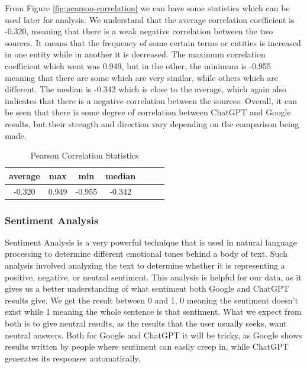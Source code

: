 \documentclass[50pt]{usiinfbachelorproject}
\begin{document}
  From Figure \ref{fig:pearson-correlation} we can have some statistics which can be used later for analysis. We understand that the average correlation coefficient is -0.320, meaning that there is a weak negative correlation between the two sources. It means that the frequency of some certain terms or entities is increased in one entity while in another it is decreased. The maximum correlation coefficient which went was 0.949, but in the other, the minimum is -0.955 meaning that there are some which are very similar, while others which are different. The median is -0.342 which is close to the average, which again also indicates that there is a negative correlation between the sources. Overall, it can be seen that there is some degree of correlation between ChatGPT and Google results, but their strength and direction vary depending on the comparison being made.

\begin{table}[H]
    \centering
    \begin{tabular}{|c|c|c|c|c|c|c|}
      \hline
      average & max & min & median \\
      \hline
      \hline
      -0.320 & 0.949 & -0.955 & -0.342 \\
      \hline
    \end{tabular}
    \caption{Pearson Correlation Statistics}
    \label{tab:cosine_similarity_statistics}
\end{table}

\subsubsection{Sentiment Analysis}
Sentiment Analysis \cite{medhat2014sentiment} is a very powerful technique that is used in natural language processing to determine different emotional tones behind a body of text. Such analysis involved analyzing the text to determine whether it is representing a positive, negative, or neutral sentiment. This analysis is helpful for our data, as it gives us a better understanding of what sentiment both Google and ChatGPT results give. We get the result between 0 and 1, 0 meaning the sentiment doesn’t exist while 1 meaning the whole sentence is that sentiment. What we expect from both is to give neutral results, as the results that the user usually seeks, want neutral answers. Both for Google and ChatGPT it will be tricky, as Google shows results written by people where sentiment can easily creep in, while ChatGPT generates its responses automatically.
\end{document}
